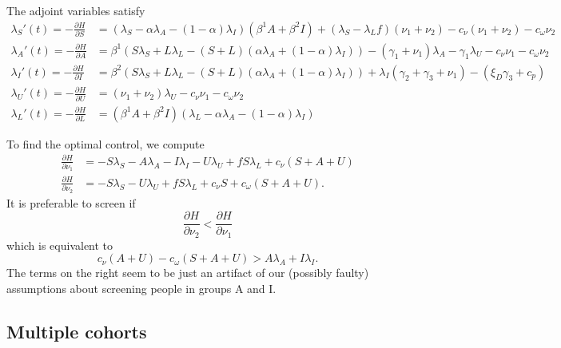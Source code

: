 \documentclass[english,12pt,letter]{article}
\begin{document}
The adjoint variables satisfy
\begin{align}
    \lambda_S'(t) = -\frac{\partial H}{\partial S} & = (\lambda_S - \alpha \lambda_A - (1-\alpha) \lambda_I) (\beta^1 A + \beta^2 I) + (\lambda_S - \lambda_L f)(\nu_1+\nu_2) - c_\nu (\nu_1 + \nu_2) - c_\omega \nu_2 \\
    \lambda_A'(t) = -\frac{\partial H}{\partial A} & =  \beta^1 ( S \lambda_S + L\lambda_L - (S+L)(\alpha\lambda_A + (1-\alpha)\lambda_I)) - (\gamma_1+\nu_1)\lambda_A - \gamma_1\lambda_U - c_\nu \nu_1 - c_\omega \nu_2 \\
    \lambda_I'(t) = -\frac{\partial H}{\partial I} & = \beta^2(S\lambda_S + L\lambda_L - (S+L)(\alpha \lambda_A + (1-\alpha)\lambda_I)) + \lambda_I(\gamma_2 + \gamma_3 + \nu_1) - (\xi_D\gamma_3+c_p) \\
    \lambda_U'(t) = -\frac{\partial H}{\partial U} & = (\nu_1+\nu_2)\lambda_U - c_\nu \nu_1 - c_\omega \nu_2 \\
    \lambda_L'(t) = -\frac{\partial H}{\partial L} & = (\beta^1 A + \beta^2 I) (\lambda_L - \alpha \lambda_A - (1-\alpha)\lambda_I)
\end{align}

To find the optimal control, we compute
\begin{align}
    \frac{\partial H}{\partial \nu_1} & = - S \lambda_S - A\lambda_A - I\lambda_I - U\lambda_U + fS\lambda_L + c_\nu(S+A+U) \\
    \frac{\partial H}{\partial \nu_2} & = -S\lambda_S - U\lambda_U + fS\lambda_L + c_\nu S + c_\omega(S+A+U).
\end{align}
It is preferable to screen if
$$
\frac{\partial H}{\partial \nu_2} < \frac{\partial H}{\partial \nu_1}
$$
which is equivalent to
$$
    c_\nu (A+U) - c_\omega(S+A+U) > A\lambda_A + I\lambda_I.
$$
The terms on the right seem to be just an artifact of our (possibly faulty) assumptions
about screening people in groups A and I.

\subsection{Multiple cohorts}




\end{document}
